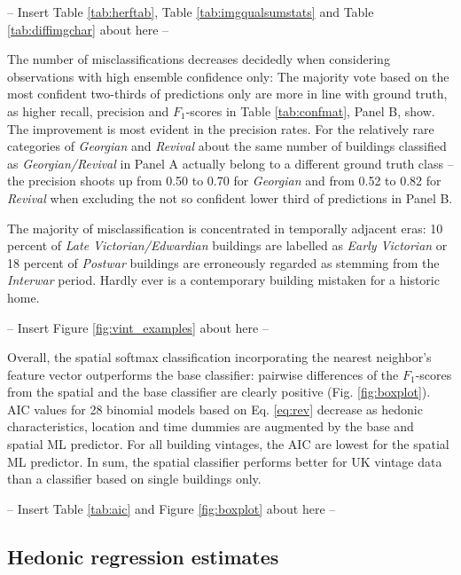 \documentclass[]{article}
\begin{document}
\begin{center}
  -- Insert Table \ref{tab:herftab}, Table \ref{tab:imgqualsumstats} and Table \ref{tab:diffimgchar} about here --
\end{center}

The number of misclassifications decreases decidedly when considering
observations with high ensemble confidence only: The majority vote based
on the most confident two-thirds of predictions only are more in line
with ground truth, as higher recall, precision and \(F_1\)-scores in
Table \ref{tab:confmat}, Panel B, show. The improvement is most evident
in the precision rates. For the relatively rare categories of
\emph{Georgian} and \emph{Revival} about the same number of buildings
classified as \emph{Georgian/Revival} in Panel A actually belong to a
different ground truth class -- the precision shoots up from 0.50 to
0.70 for \emph{Georgian} and from 0.52 to 0.82 for \emph{Revival} when
excluding the not so confident lower third of predictions in Panel B.

The majority of misclassification is concentrated in temporally adjacent
eras: 10 percent of \emph{Late Victorian/Edwardian} buildings are
labelled as \emph{Early Victorian} or 18 percent of \emph{Postwar}
buildings are erroneously regarded as stemming from the \emph{Interwar}
period. Hardly ever is a contemporary building mistaken for a historic
home.

\begin{center}
  -- Insert Figure \ref{fig:vint_examples} about here --
\end{center}

Overall, the spatial softmax classification incorporating the nearest
neighbor's feature vector outperforms the base classifier: pairwise
differences of the \(F_1\)-scores from the spatial and the base
classifier are clearly positive (Fig. \ref{fig:boxplot}). AIC values for
28 binomial models based on Eq. \ref{eq:rev} decrease as hedonic
characteristics, location and time dummies are augmented by the base and
spatial ML predictor. For all building vintages, the AIC are lowest for
the spatial ML predictor. In sum, the spatial classifier performs better
for UK vintage data than a classifier based on single buildings only.

\begin{center}
  -- Insert Table \ref{tab:aic} and Figure \ref{fig:boxplot} about here --
\end{center}

\hypertarget{hedonic-regression-estimates}{%
\subsection{Hedonic regression
estimates}\label{hedonic-regression-estimates}}
\end{document}
